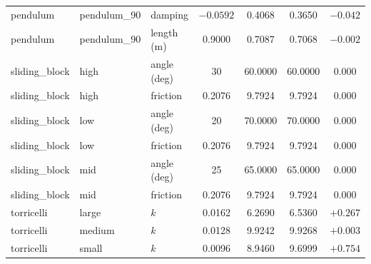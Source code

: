 \begin{table}[t]
\begin{tabular}{@{}lllS[table-format=2.4]S[table-format=2.4]S[table-format=2.4]S[table-format=-2.4]@{}}
pendulum     & pendulum\_90 & damping & $-0.0592$ & 0.4068 & 0.3650 & $-0.042$ \\
pendulum     & pendulum\_90 & length (m) & 0.9000 & 0.7087 & 0.7068 & $-0.002$ \\
sliding\_block & high  & angle (deg) & 30 & 60.0000 & 60.0000 & 0.000 \\
sliding\_block & high  & friction & 0.2076 & 9.7924 & 9.7924 & 0.000 \\
sliding\_block & low   & angle (deg) & 20 & 70.0000 & 70.0000 & 0.000 \\
sliding\_block & low   & friction & 0.2076 & 9.7924 & 9.7924 & 0.000 \\
sliding\_block & mid   & angle (deg) & 25 & 65.0000 & 65.0000 & 0.000 \\
sliding\_block & mid   & friction & 0.2076 & 9.7924 & 9.7924 & 0.000 \\
torricelli   & large  & $k$ & 0.0162 & 6.2690 & 6.5360 & $+0.267$ \\
torricelli   & medium & $k$ & 0.0128 & 9.9242 & 9.9268 & $+0.003$ \\
torricelli   & small  & $k$ & 0.0096 & 8.9460 & 9.6999 & $+0.754$ \\
\bottomrule
\end{tabular}
\end{table}


